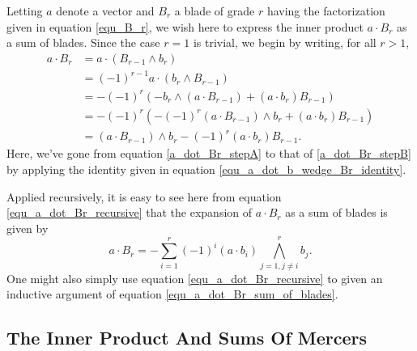 \documentclass{birkjour}
\theoremstyle{definition}
\theoremstyle{remark}
\numberwithin{equation}{section}
\begin{document}
Letting $a$ denote a vector and $B_r$ a blade of grade $r$ having the factorization
given in equation \eqref{equ_B_r}, we wish here to express the inner product $a\cdot B_r$ as a sum of blades.
Since the case $r=1$ is trivial, we begin by writing, for all $r>1$,
\begin{align}
a\cdot B_r
 &= a\cdot(B_{r-1}\wedge b_r)\nonumber \\
 &= (-1)^{r-1}a\cdot(b_r\wedge B_{r-1})\label{a_dot_Br_stepA} \\
 &= -(-1)^r\left(-b_r\wedge(a\cdot B_{r-1})+(a\cdot b_r)B_{r-1}\right)\label{a_dot_Br_stepB} \\
 &= -(-1)^r\left(-(-1)^r(a\cdot B_{r-1})\wedge b_r+(a\cdot b_r)B_{r-1}\right)\nonumber \\
 &= (a\cdot B_{r-1})\wedge b_r - (-1)^r(a\cdot b_r)B_{r-1}.\label{equ_a_dot_Br_recursive}
\end{align}
Here, we've gone from equation \eqref{a_dot_Br_stepA} to that of \eqref{a_dot_Br_stepB} by
applying the identity given in equation \eqref{equ_a_dot_b_wedge_Br_identity}.

Applied recursively, it is easy to see here from equation \eqref{equ_a_dot_Br_recursive} that the expansion of
$a\cdot B_r$ as a sum of blades is given by
\begin{equation}\label{equ_a_dot_Br_sum_of_blades}
a\cdot B_r = -\sum_{i=1}^r(-1)^i(a\cdot b_i)\bigwedge_{j=1,j\neq i}^r b_j.
\end{equation}
One might also simply use equation \eqref{equ_a_dot_Br_recursive} to given an inductive
argument of equation \eqref{equ_a_dot_Br_sum_of_blades}.


\subsection{The Inner Product And Sums Of Mercers}
\end{document}
